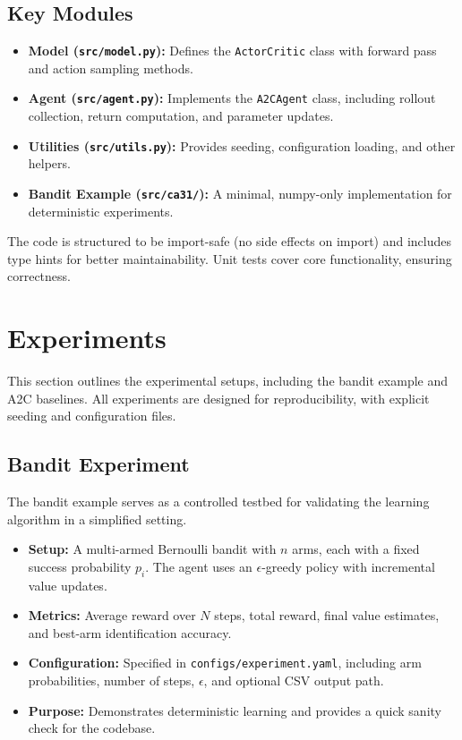 \documentclass[11pt]{article}
\begin{document}
\subsection{Key Modules}
\begin{itemize}
  \item \textbf{Model (\texttt{src/model.py}):} Defines the \texttt{ActorCritic} class with forward pass and action sampling methods.
  \item \textbf{Agent (\texttt{src/agent.py}):} Implements the \texttt{A2CAgent} class, including rollout collection, return computation, and parameter updates.
  \item \textbf{Utilities (\texttt{src/utils.py}):} Provides seeding, configuration loading, and other helpers.
  \item \textbf{Bandit Example (\texttt{src/ca31/}):} A minimal, numpy-only implementation for deterministic experiments.
\end{itemize}

The code is structured to be import-safe (no side effects on import) and includes type hints for better maintainability. Unit tests cover core functionality, ensuring correctness.
\section{Experiments}
This section outlines the experimental setups, including the bandit example and A2C baselines. All experiments are designed for reproducibility, with explicit seeding and configuration files.

\subsection{Bandit Experiment}
The bandit example serves as a controlled testbed for validating the learning algorithm in a simplified setting.

\begin{itemize}
  \item \textbf{Setup:} A multi-armed Bernoulli bandit with $n$ arms, each with a fixed success probability $p_i$. The agent uses an $\epsilon$-greedy policy with incremental value updates.
  \item \textbf{Metrics:} Average reward over $N$ steps, total reward, final value estimates, and best-arm identification accuracy.
  \item \textbf{Configuration:} Specified in \texttt{configs/experiment.yaml}, including arm probabilities, number of steps, $\epsilon$, and optional CSV output path.
  \item \textbf{Purpose:} Demonstrates deterministic learning and provides a quick sanity check for the codebase.
\end{itemize}
\end{document}
